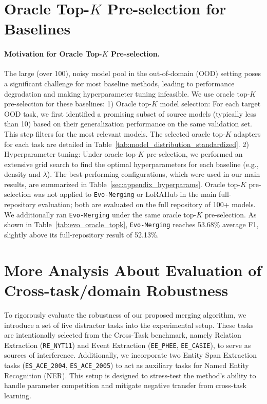 \section{Oracle Top-$K$ Pre-selection for Baselines}
\label{sec: Pre-selection Strategy for Baselines in OOD Setting}
\paragraph{Motivation for Oracle Top-$K$ Pre-selection.} 
The large (over 100), noisy model pool in the out-of-domain (OOD) setting poses a significant challenge for most baseline methods, leading to performance degradation and making hyperparameter tuning infeasible. We use oracle top-$K$ pre-selection for these baselines: 1) Oracle top-$K$ model selection: For each target OOD task, we first identified a promising subset of source models (typically less than 10) based on their generalization performance on the same validation set. This step filters for the most relevant models. The selected oracle top-$K$ adapters for each task are detailed in Table~\ref{tab:model_distribution_standardized}.
2) Hyperparameter tuning: Under oracle top-$K$ pre-selection, we performed an extensive grid search to find the optimal hyperparameters for each baseline (e.g., density and $\lambda$). The best-performing configurations, which were used in our main results, are summarized in Table~\ref{sec:appendix_hyperparams}.
Oracle top-$K$ pre-selection was not applied to \texttt{Evo-Merging} or LoRAHub in the main full-repository evaluation; both are evaluated on the full repository of 100+ models. We additionally ran \texttt{Evo-Merging} under the same oracle top-$K$ pre-selection. As shown in Table~\ref{tab:evo_oracle_topk}, \texttt{Evo-Merging} reaches 53.68\% average F1, slightly above its full-repository result of 52.13\%.



\section{More Analysis About Evaluation of Cross-task/domain Robustness }
\label{sec: More analyse about Evo-Merging on Muti-task merging}
To rigorously evaluate the robustness of our proposed merging algorithm, we introduce a set of five distractor tasks into the experimental setup. These tasks are intentionally selected from the Cross-Task benchmark, namely Relation Extraction (\texttt{RE\_NYT11}) and Event Extraction (\texttt{EE\_PHEE}, \texttt{EE\_CASIE}), to serve as sources of interference. Additionally, we incorporate two Entity Span Extraction tasks (\texttt{ES\_ACE\_2004}, \texttt{ES\_ACE\_2005}) to act as auxiliary tasks for Named Entity Recognition (NER). This setup is designed to stress-test the method's ability to handle parameter competition and mitigate negative transfer from cross-task learning.

